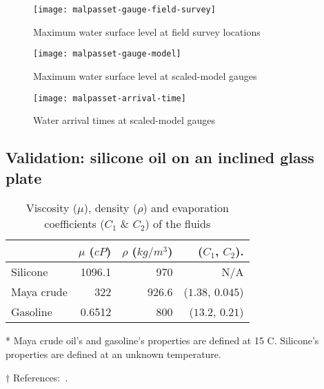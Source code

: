 \begin{figure}
    \centering
    \texttt{[image: malpasset-gauge-field-survey]}
    \caption{Maximum water surface level at field survey locations}\label{fig:malpasset-gauge-field-survey}
\end{figure}

\begin{figure}
    \centering
    \texttt{[image: malpasset-gauge-model]}
    \caption{Maximum water surface level at scaled-model gauges}\label{fig:malpasset-gauge-model}
\end{figure}

\begin{figure}
    \centering
    \texttt{[image: malpasset-arrival-time]}
    \caption{Water arrival times at scaled-model gauges}\label{fig:malpasset-arrival-time}
\end{figure}

\subsection{Validation: silicone oil on an inclined glass plate}

\begin{table}
    \caption{Viscosity ($\mu$), density ($\rho$) and evaporation coefficients ($C_1$ \& $C_2$) of the fluids}\label{table:fluid-properties}
    \begin{threeparttable}
        \begin{tabular*}{\tblwidth}{@{} LRRR@{} }
            \toprule
            & $\mu$ ($cP$) & $\rho$ ($kg/m^3$) & ($C_1$, $C_2$). \\
            \midrule
            Silicone    & 1096.1 & 970 & N/A \\
            Maya crude  & 322 & 926.6 & ($1.38$, $0.045$) \\
            Gasoline    & 0.6512 & 800 & ($13.2$, $0.21$) \\
            \bottomrule
        \end{tabular*}
        \begin{tablenotes}\footnotesize
            \item[*] Maya crude oil's and gasoline's properties are defined at 15\degree{} C.
                Silicone's properties are defined at an unknown temperature.
            \item[$\dagger$] References:~\cite{fingas_appendix_2015}.
        \end{tablenotes}
    \end{threeparttable}
\end{table}



